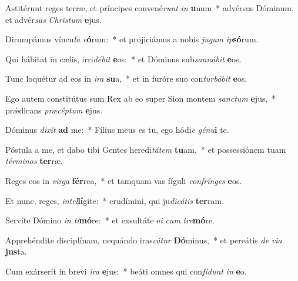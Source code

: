 \item Astitérunt reges terræ, et príncipes convené\textit{runt} \textit{in} \textbf{u}num~* advérsus Dóminum, et advér\textit{sus} \textit{Chris}\textit{tum} \textbf{e}jus.
\item Dirumpámus víncu\textit{la} \textit{e}\textbf{ó}rum:~* et projiciámus a nobis \textit{ju}\textit{gum} \textit{ip}\textbf{só}rum.
\item Qui hábitat in cælis, irri\textit{dé}\textit{bit} \textbf{e}os:~* et Dóminus sub\textit{san}\textit{ná}\textit{bit} \textbf{e}os.
\item Tunc loquétur ad eos in \textit{i}\textit{ra} \textbf{su}a,~* et in furóre suo con\textit{tur}\textit{bá}\textit{bit} \textbf{e}os.
\item Ego autem constitútus sum Rex ab eo super Sion montem \textit{sanc}\textit{tum} \textbf{e}jus,~* prǽdicans \textit{præ}\textit{cép}\textit{tum} \textbf{e}jus.
\item Dóminus \textit{di}\textit{xit} \textbf{ad} me:~* Fílius meus es tu, ego hódi\textit{e} \textit{gé}\textit{nu}\textbf{i} te.
\item Póstula a me, et dabo tibi Gentes heredi\textit{tá}\textit{tem} \textbf{tu}am,~* et possessiónem tuam \textit{tér}\textit{mi}\textit{nos} \textbf{ter}ræ.
\item Reges eos in \textit{vir}\textit{ga} \textbf{fér}rea,~* et tamquam vas fíguli \textit{con}\textit{frín}\textit{ges} \textbf{e}os.
\item Et nunc, reges, \textit{in}\textit{tel}\textbf{lí}gite:~* erudímini, qui ju\textit{di}\textit{cá}\textit{tis} \textbf{ter}ram.
\item Servíte Dómino \textit{in} \textit{ti}\textbf{mó}re:~* et exsultáte e\textit{i} \textit{cum} \textit{tre}\textbf{mó}re.
\item Apprehéndite disciplínam, nequándo iras\textit{cá}\textit{tur} \textbf{Dó}minus,~* et pereátis \textit{de} \textit{vi}\textit{a} \textbf{jus}ta.
\item Cum exárserit in brevi \textit{i}\textit{ra} \textbf{e}jus:~* beáti omnes qui con\textit{fí}\textit{dunt} \textit{in} \textbf{e}o.
